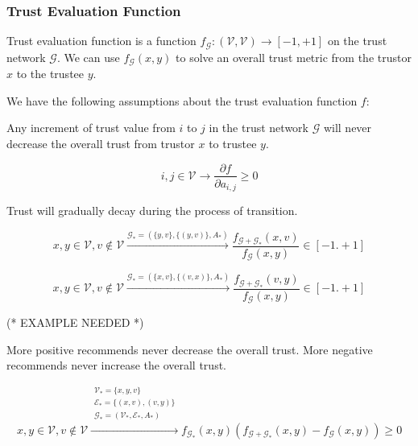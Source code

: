 \documentclass{article}
\begin{document}
\subsubsection{Trust Evaluation Function}

Trust evaluation function is a function \(f_{\mathcal{G}}:(\mathcal{V},\mathcal{V})\to [-1,+1]\) on the trust network \(\mathcal{G}\). We can use
\(f_{\mathcal{G}}(x,y)\) to solve an overall trust metric from the trustor \(x\) to the trustee \(y\).

We have the following assumptions about the trust evaluation function \(f\):

Any increment of trust value from \(i\) to \(j\) in the trust network \(\mathcal{G}\) will never decrease the overall trust from trustor \(x\) to
trustee \(y\).

\begin{equation}
i,j\in \mathcal{V}\to \frac{\partial f}{\partial a_{i,j}}\geq 0
\end{equation}

Trust will gradually decay during the process of transition.

\begin{equation}
x,y\in \mathcal{V},v\notin \mathcal{V}\overset{\mathcal{G}_*=\left(\{y,v\},\{(y,v)\},A_*\right)}{\to }\frac{f_{\mathcal{G}+\mathcal{G}_*}(x,v)}{f_{\mathcal{G}}(x,y)}\in
[-1.+1]
\end{equation}

\begin{equation}
x,y\in \mathcal{V},v\notin \mathcal{V}\overset{\mathcal{G}_*=\left(\{x,v\},\{(v,x)\},A_*\right)}{\to }\frac{f_{\mathcal{G}+\mathcal{G}_*}(v,y)}{f_{\mathcal{G}}(x,y)}\in
[-1.+1]
\end{equation}

(* EXAMPLE NEEDED *)

More positive recommends never decrease the overall trust. More negative recommends never increase the overall trust.

\begin{equation}
x,y\in \mathcal{V},v\notin \mathcal{V}\overset{
\begin{array}{c}
 \mathcal{V}_*=\{x,y,v\} \\
 \mathcal{E}_*=\{(x,v),(v,y)\} \\
 \mathcal{G}_*=\left(\mathcal{V}_*,\mathcal{E}_*,A_*\right) \\
\end{array}
}{\to }f_{\mathcal{G}_*}(x,y)\left(f_{\mathcal{G}+\mathcal{G}_*}(x,y)-f_{\mathcal{G}}(x,y)\right)\geq 0
\end{equation}
\end{document}
